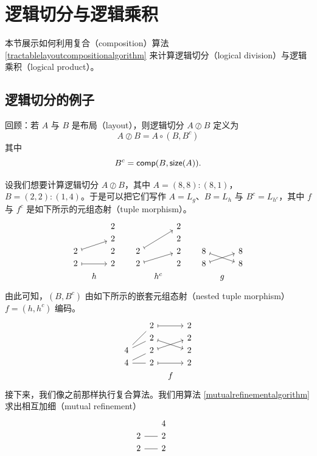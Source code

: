 \section{逻辑切分与逻辑乘积}
本节展示如何利用复合（composition）算法 \ref{tractablelayoutcompositionalgorithm} 来计算逻辑切分（logical division）与逻辑乘积（logical product）。
\subsection{逻辑切分的例子}
回顾：若 $A$ 与 $B$ 是布局（layout），则逻辑切分 $A \oslash B$ 定义为
\[
A \oslash B = A \circ (B,B^c)
\]
其中
\[
B^c = \mathsf{comp}(B, \mathsf{size}(A)).
\]

\begin{example}
    设我们想要计算逻辑切分 $A \oslash B$，其中 $A = (8,8):(8,1)$，$B = (2,2):(1,4)$。于是可以把它们写作 $A = L_g$、$B = L_h$ 与 $B^c = L_{h^c}$，其中 $f$ 与 $f^c$ 是如下所示的元组态射（tuple morphism）。
    \[ \begin{tikzcd} [row sep = 1, column sep = 8]
     & & 2 & & & & 2 & & & & \\
     & & 2 & & & & 2 & & & & \\
    2 \ar[urr,mapsto] & & 2 & & 2 \ar[uurr,mapsto] & & 2 & & 8 \ar[drr,mapsto] & & 8\\
    2 \ar[rr,mapsto] & & 2 & & 2 \ar[urr,mapsto] & & 2 & & 8 \ar[urr,mapsto] & & 8\\
     & h & & & & h^c & & & & g &   \\
    \end{tikzcd} \]
    由此可知，$(B,B^c)$ 由如下所示的嵌套元组态射（nested tuple morphism）$f = (h,h^c)$ 编码。
    \[ \begin{tikzcd} [row sep = 1, column sep = 8]
      & & 2 \ar[rr,mapsto] & & 2 \\
      & & 2 \ar[drr,mapsto] & & 2\\
    4 \ar[urr,-] \ar[uurr,-] & & 2 \ar[urr,mapsto] & & 2 \\
    4 \ar[rr,-] \ar[urr,-]  & & 2 \ar[rr,mapsto] & & 2\\
    & & & f &
    \end{tikzcd} \]
    接下来，我们像之前那样执行复合算法。我们用算法 \ref{mutualrefinementalgorithm} 求出相互加细（mutual refinement）
    \[ \begin{tikzcd} [row sep = 1, column sep = 8]
       & & 4 & & \\
       2 \ar[rr,-] & & 2 & & \\
       2 \ar[rr,-]& & 2 & & \\

\end{tikzcd}\]
\end{example}
